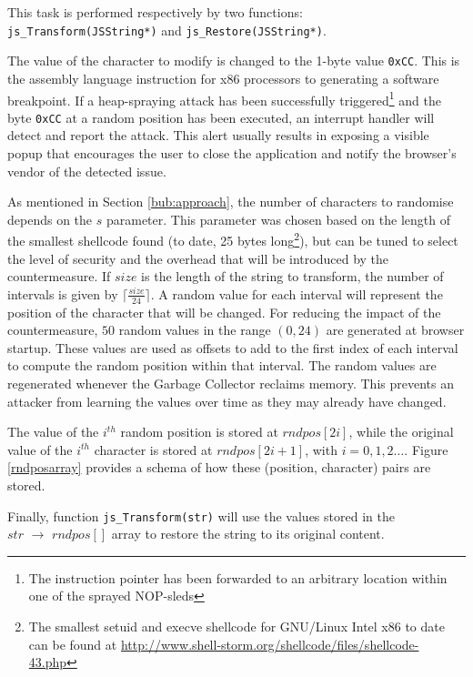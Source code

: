 This task is performed respectively by two functions:\\
\texttt{js\_Transform(JSString*)} and \texttt{js\_Restore(JSString*)}.

The value of the character to modify is changed to the 1-byte value \texttt{0xCC}. This is the assembly language instruction for x86 processors to generating a software breakpoint. If a heap-spraying attack has been successfully triggered\footnote{The instruction pointer has been forwarded to an arbitrary location within one of the sprayed NOP-sleds} and the byte \texttt{0xCC} at a random position has been executed, an interrupt handler will detect and report the attack. This alert usually results in exposing a visible popup that encourages the user to close the application and notify the browser's vendor of the detected issue.

As mentioned in Section \ref{bub:approach}, the number of characters to randomise depends on the $s$ parameter. This parameter was chosen based on the length of the smallest shellcode found (to date, 25 bytes long\footnote{The smallest setuid and execve shellcode for GNU/Linux Intel x86 to date can be found at \url{http://www.shell-storm.org/shellcode/files/shellcode-43.php}}), but can be tuned to select the level of security and the overhead that will be introduced by the countermeasure.
If $size$ is the length of the string to transform, the number of intervals is given by $\lceil \frac{size}{24} \rceil $. 
A random value for each interval will represent the position of the character that will be changed. 
For reducing the impact of the countermeasure, $50$ random values in the range $(0,24)$ are generated at browser startup. These values are used as offsets to add to the first index of each interval to compute the random position within that interval. The random values are regenerated whenever the Garbage Collector reclaims memory. This prevents an attacker from learning the values over time as they may already have changed.

The value of the $i^{th}$ random position is stored at $rndpos[2i]$, while the original value of the $i^{th}$ character is stored at $rndpos[2i+1]$, with $i=0,1,2\dots$. Figure \ref{rndposarray} provides a schema of how these (position, character) pairs are stored.

Finally, function \texttt{js\_Transform(str)} will use the values stored in the \\
$str$ $\rightarrow$ $rndpos[]$ array to restore the string to its original content.
	
